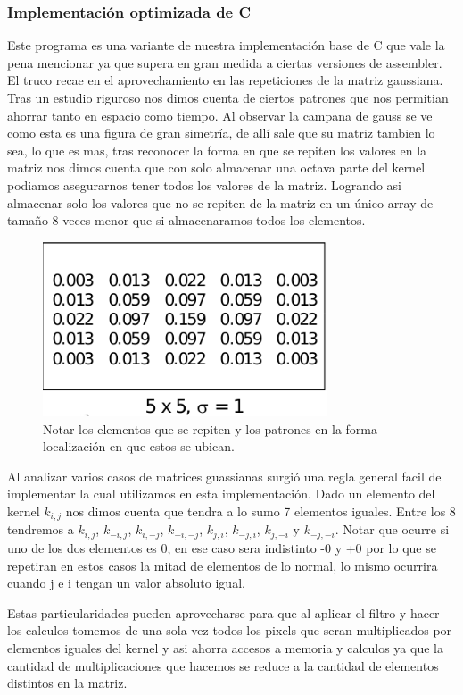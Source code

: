 \subsubsection{Implementación optimizada de C}

Este programa es una variante de nuestra implementación base de C que vale la pena mencionar ya que supera en gran medida a ciertas versiones de assembler. El truco recae en el aprovechamiento en las repeticiones de la matriz gaussiana. Tras un estudio riguroso nos dimos cuenta de ciertos patrones que nos permitian ahorrar tanto en espacio como tiempo. Al observar la campana de gauss se ve como esta es una figura de gran simetría, de allí sale que su matriz tambien lo sea, lo que es mas, tras reconocer la forma en que se repiten los valores en la matriz nos dimos cuenta que con solo almacenar una octava parte del kernel podiamos asegurarnos tener todos los valores de la matriz. Logrando asi almacenar solo los valores que no se repiten de la matriz en un único array de tamaño 8 veces menor que si almacenaramos todos los elementos.


\begin{figure}[H]
 	\centering
 	\includegraphics[width=0.75\textwidth]{./imgs/gaussian_kernel.png}
	\caption{\footnotesize Notar los elementos que se repiten y los patrones en la forma localización en que estos se ubican.}
	\label{fig:lineplot.diff}
\end{figure}


Al analizar varios casos de matrices guassianas surgió una regla general facil de implementar la cual utilizamos en esta implementación. Dado un elemento del kernel $k_{i,j}$ nos dimos cuenta que tendra a lo sumo 7 elementos iguales. Entre los 8 tendremos a $k_{i,j}$, $k_{-i,j}$, $k_{i,-j}$, $k_{-i,-j}$, $k_{j,i}$, $k_{-j,i}$, $k_{j,-i}$ y $k_{-j,-i}$. Notar que ocurre si uno de los dos elementos es 0, en ese caso sera indistinto -0 y +0 por lo que se repetiran en estos casos la mitad de elementos de lo normal, lo mismo ocurrira cuando j e i tengan un valor absoluto igual.

Estas particularidades pueden aprovecharse para que al aplicar el filtro y hacer los calculos tomemos de una sola vez todos los pixels que seran multiplicados por elementos iguales del kernel y asi ahorra accesos a memoria y calculos ya que la cantidad de multiplicaciones que hacemos se reduce a la cantidad de elementos distintos en la matriz.